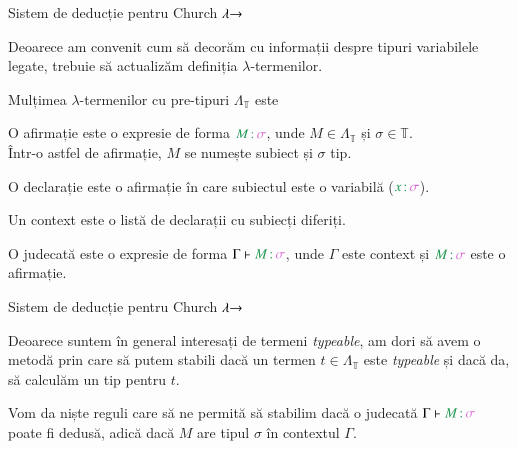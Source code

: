 \documentclass[xcolor=pdftex,romanian,colorlinks]{beamer}
\begin{document}
\begin{frame}{Sistem de deducție pentru Church $\lambda\hspace{-.1cm}\to$}

Deoarece am convenit cum să decorăm cu informații despre tipuri variabilele legate, trebuie să actualizăm definiția $\lambda$-termenilor.

\medskip
Mulțimea \alert{$\lambda$-termenilor cu pre-tipuri $\Lambda_\mathbb{T}$} este 
\vspace{-.3cm}
\begin{center}
\end{center}

O \alert{afirmație} este o expresie de forma $\type{M}{\sigma}$, unde $M \in \Lambda_\mathbb{T}$ și $\sigma\in \mathbb{T}$.\\
Într-o astfel de afirmație, $M$ se numește \alert{subiect} și $\sigma$ \alert{tip}.

\medskip
O \alert{declarație} este o afirmație în care subiectul este o variabilă ($\type{x}{\sigma}$).

\medskip
Un \alert{context} este o listă de declarații cu subiecți diferiți.

\medskip
O \alert{judecată} este o expresie de forma $\Gamma \vdash \type{M}{\sigma}$, unde $\Gamma$ este context și $\type{M}{\sigma}$ este o afirmație.

\end{frame}

\begin{frame}{Sistem de deducție pentru Church $\lambda\hspace{-.1cm}\to$}

Deoarece suntem în general interesați de termeni \textit{typeable}, am dori să avem o metodă prin care să putem stabili dacă un termen $t \in \Lambda_\mathbb{T}$ este \textit{typeable} și dacă da, să calculăm un tip pentru $t$.

Vom da niște reguli care să ne permită să stabilim dacă o judecată $\Gamma \vdash \type{M}{\sigma}$ poate fi dedusă, adică dacă $M$ are tipul $\sigma$ în contextul $\Gamma$.
\end{frame}
\end{document}
